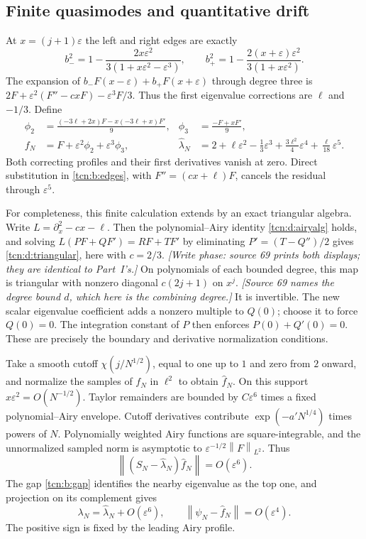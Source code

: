 \documentclass[11pt,letterpaper]{article}
\newcommand{\norm}[1]{\left\lVert#1\right\rVert}
\newcommand{\eps}{\varepsilon}
\theoremstyle{remark}
\begin{document}
\subsection{Finite quasimodes and quantitative drift}\label{tcn:b:sec:route3}
At $x=(j+1)\eps$ the left and right edges are exactly
\begin{equation}
 b_-^2=1-\frac{2x\eps^2}{3(1+x\eps^2-\eps^3)},\qquad
 b_+^2=1-\frac{2(x+\eps)\eps^2}{3(1+x\eps^2)}.             \label{tcn:b:edges}
\end{equation}
The expansion of $b_-F(x-\eps)+b_+F(x+\eps)$ through degree three is
$2F+\eps^2(F''-cxF)-\eps^3F/3$. Thus the first eigenvalue corrections are $\ell$ and $-1/3$. Define
\begin{align*}
 \phi_2&=\frac{(-3\ell+2x)F-x(-3\ell+x)F'}9,
 &\phi_3&=\frac{-F+xF'}9,\\
 f_N&=F+\eps^2\phi_2+\eps^3\phi_3,
 &\widehat\lambda_N&=2+\ell\eps^2-\frac13\eps^3
                   +\frac{3\ell^2}4\eps^4+\frac\ell{18}\eps^5.
\end{align*}
Both correcting profiles and their first derivatives vanish at zero. Direct substitution in \eqref{tcn:b:edges}, with $F''=(cx+\ell)F$, cancels the residual through $\eps^5$.

For completeness, this finite calculation extends by an exact triangular algebra. Write $L=\partial_x^2-cx-\ell$. Then the polynomial--Airy identity \eqref{tcn:d:airyalg} holds, and solving $L(PF+QF')=RF+TF'$ by eliminating $P'=(T-Q'')/2$ gives \eqref{tcn:d:triangular}, here with $c=2/3$. \emph{[Write phase: source 69 prints both displays; they are identical to Part~I's.]} On polynomials of each bounded degree, this map is triangular with nonzero diagonal $c(2j+1)$ on $x^j$. \emph{[Source 69 names the degree bound $d$, which here is the combining degree.]} It is invertible. The new scalar eigenvalue coefficient adds a nonzero multiple to $Q(0)$; choose it to force $Q(0)=0$. The integration constant of $P$ then enforces $P(0)+Q'(0)=0$. These are precisely the boundary and derivative normalization conditions.

Take a smooth cutoff $\chi(j/N^{1/2})$, equal to one up to $1$ and zero from $2$ onward, and normalize the samples of $f_N$ in $\ell^2$ to obtain $\widehat f_N$. On this support $x\eps^2=O(N^{-1/2})$. Taylor remainders are bounded by $C\eps^6$ times a fixed polynomial--Airy envelope. Cutoff derivatives contribute $\exp(-a'N^{1/4})$ times powers of $N$. Polynomially weighted Airy functions are square-integrable, and the unnormalized sampled norm is asymptotic to $\eps^{-1/2}\norm F_{L^2}$. Thus
\[
 \norm{(S_N-\widehat\lambda_N)\widehat f_N}=O(\eps^6).
\]
The gap \eqref{tcn:b:gap} identifies the nearby eigenvalue as the top one, and projection on its complement gives
\begin{equation}
 \lambda_N=\widehat\lambda_N+O(\eps^6),\qquad
 \norm{\psi_N-\widehat f_N}=O(\eps^4).                     \label{tcn:b:quasi-error}
\end{equation}
The positive sign is fixed by the leading Airy profile.
\end{document}
